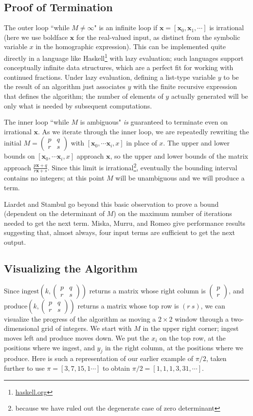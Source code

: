 \documentclass[11pt, oneside]{amsart}   	%
\newcommand{\pqrs}{\left(
\begin{smallmatrix} 
p & q\\ 
r & s 
\end{smallmatrix}
\right)}
\renewcommand{\:}{\negthickspace:\negthickspace}
\begin{document}
\subsection{Proof of Termination}
The outer loop ``while $M \neq \infty$" is an infinite loop if $\mathbf{x} = [\mathbf{x}_0, \mathbf{x}_1,\cdots]$ is irrational
(here we use boldface $\mathbf{x}$ for the real-valued input, as distinct from the symbolic variable $x$ in the homographic
expression). This can be implemented quite directly in a language like Haskell\footnote{\href{https://haskell.org}{haskell.org}} with
lazy evaluation\cite{hutton2007programming}; such languages support conceptually infinite data structures, which are a perfect fit for working with continued
fractions. Under lazy evaluation, defining a list-type variable $y$ to be the result of an algorithm just associates $y$ with the finite recursive
expression that defines the algorithm; the number of elements of $y$ actually generated will be only what is needed by subsequent computations.

The inner loop ``while $M$ is ambiguous" \emph{is} guaranteed to terminate even on irrational $\mathbf{x}$. As
we iterate through the inner loop, we are repeatedly rewriting the initial $M = \pqrs$
with $[\mathbf{x}_0, \cdots \mathbf{x}_i, x]$ in place of $x$. The upper and lower bounds on
$[\mathbf{x}_0, \cdots \mathbf{x}_i, x]$ approach $\mathbf{x}$, so the upper and lower bounds of the matrix approach
$\frac{p\mathbf{x}+q}{r\mathbf{x}+s}$.
Since this limit is irrational\footnote{because we have ruled out the degenerate case of zero determinant}, eventually the bounding interval contains no integers; at this point $M$  will be unambiguous
 and we will produce a term.
 
 Liardet and Stambul \cite{LSAlgebraic1998} go beyond this basic observation to prove a bound (dependent on the determinant of $M$) on the maximum number of iterations needed to get the next term. Miska, Murru, and Romeo \cite{miska2025} give performance results suggesting that, almost always, four input terms are sufficient to get the next output.

\subsection{Visualizing the Algorithm}
Since $\mbox{ingest}(k,\pqrs)$ returns a matrix whose right column is
$\left( \begin{smallmatrix} p \\  r \end{smallmatrix}\right)$,
and $\mbox{produce}(k,\pqrs)$ returns a matrix whose top row is $(r\ s)$, we can visualize the progress of the algorithm
as moving a $2 \times 2$ window through a two-dimensional grid of integers.
We start with $M$ in the upper right corner; ingest moves left and produce moves down.
We put the $x_i$ on the top row, at the positions where we ingest, and $y_j$ in the right column, at the positions where we produce.
Here is such a representation of our earlier example of $\pi/2$, taken further to use $\pi = [3,7,15, 1\cdots]$ to obtain $\pi/2 = [1,1,1,3,31,\cdots]$.
\end{document}
